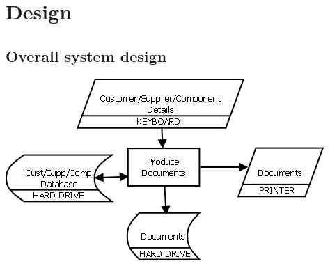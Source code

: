 \chapter{Design}
	\section{Overall system design}
\begin{center}\includegraphics[scale=0.5]{systemsflowchart}\end{center}
